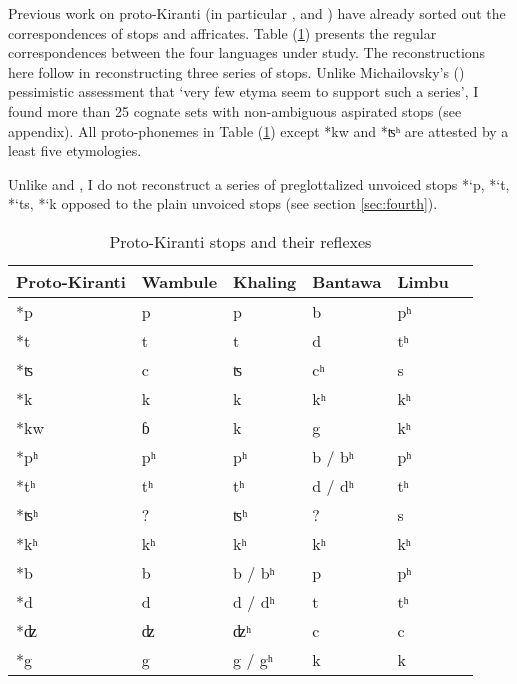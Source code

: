\documentclass[oldfontcommands,oneside,a4paper,11pt]{article}
\newcommand{\ipa}[1]{{\phon\mbox{#1}}} %
\begin{document}
Previous work on proto-Kiranti (in particular \citealt{starostin94kiranti}, \citealt{michailovsky94stops} and \citealt{opgenort05jero}) have already sorted out the correspondences of stops and affricates. Table (\ref{tab:stops}) presents the regular correspondences between the four languages under study. The reconstructions here follow \citet{michailovsky94stops} in reconstructing three series of stops. Unlike Michailovsky's (\citeyear{michailovsky10kiranti}) pessimistic assessment that `very  few etyma seem to support such a series', I found more than 25 cognate sets with non-ambiguous aspirated stops (see appendix). All proto-phonemes in Table (\ref{tab:stops}) except *\ipa{kw} and *\ipa{ʦʰ} are attested by a least five etymologies.

Unlike \citet{starostin94kiranti} and \citet{opgenort05jero}, I do not reconstruct a series of preglottalized unvoiced stops *\ipa{`p},  *\ipa{`t},  *\ipa{`ts},  *\ipa{`k} opposed to the plain unvoiced stops (see section \ref{sec:fourth}). 


\begin{table}[H]
\caption{Proto-Kiranti stops and their reflexes} \centering \label{tab:stops}
\begin{tabular}{llllll}
\toprule
Proto-Kiranti & Wambule & Khaling & Bantawa & Limbu \\
\midrule
\ipa{*p} & \ipa{p} & \ipa{p} & \ipa{b} & \ipa{pʰ}  \\
\ipa{*t} & \ipa{t} & \ipa{t} & \ipa{d} & \ipa{tʰ}  \\
\ipa{*ʦ} & \ipa{c} & \ipa{ʦ} & \ipa{cʰ} & \ipa{s}  \\
\ipa{*k} & \ipa{k} & \ipa{k} & \ipa{kʰ} & \ipa{kʰ}  \\
\midrule
\ipa{*kw} & \ipa{ɓ} & \ipa{k} & \ipa{g} & \ipa{kʰ}  \\
\midrule
\ipa{*pʰ} & \ipa{pʰ} & \ipa{pʰ} & \ipa{b} / \ipa{bʰ}  & \ipa{pʰ}  \\
\ipa{*tʰ} & \ipa{tʰ} & \ipa{tʰ} & \ipa{d} / \ipa{dʰ} & \ipa{tʰ}  \\
\ipa{*ʦʰ} & ? & \ipa{ʦʰ} & ? & \ipa{s}  \\
\ipa{*kʰ} & \ipa{kʰ} & \ipa{kʰ} & \ipa{kʰ} & \ipa{kʰ}  \\
\midrule
\ipa{*b} & \ipa{b} &\ipa{b} / \ipa{bʰ}  & \ipa{p} & \ipa{pʰ}  \\
\ipa{*d} & \ipa{d} & \ipa{d} / \ipa{dʰ}  & \ipa{t} & \ipa{tʰ}  \\
\ipa{*ʣ} & \ipa{ʣ} & \ipa{ʣʰ} & \ipa{c} & \ipa{c}  \\
\ipa{*g} & \ipa{g} & \ipa{g} / \ipa{gʰ}  & \ipa{k} & \ipa{k}  \\
\bottomrule
\end{tabular}
\end{table}
\end{document}

